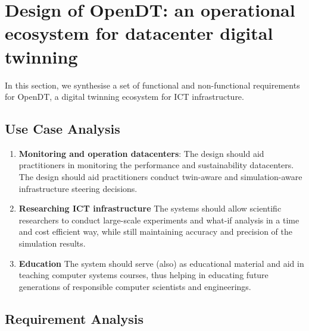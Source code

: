 \section{Design of OpenDT: an operational ecosystem for datacenter digital twinning}\label{sec:design}

In this section, we synthesise a set of functional and non-functional requirements for OpenDT, a digital twinning ecosystem for ICT infrastructure.

\subsection{Use Case Analysis}\label{sec:design:usecases}

\begin{enumerate}[label=\textbf{(UC\arabic*)},leftmargin=0pt,itemindent=3em]
    \item \label{design:uc1} \textbf{Monitoring and operation datacenters}: The design should aid practitioners in monitoring the performance and sustainability datacenters. The design should aid practitioners conduct twin-aware and simulation-aware infrastructure steering decisions.
    \item \label{design:uc2} \textbf{Researching ICT infrastructure} The systems should allow scientific researchers to conduct large-scale experiments and what-if analysis in a time and cost efficient way, while still maintaining accuracy and precision of the simulation results.
    \item \label{design:uc3} \textbf{Education} The system should serve (also) as educational material and aid in teaching computer systems courses, thus helping in educating future generations of responsible computer scientists and engineerings.
\end{enumerate}

\subsection{Requirement Analysis}\label{sec:design:requirements}

